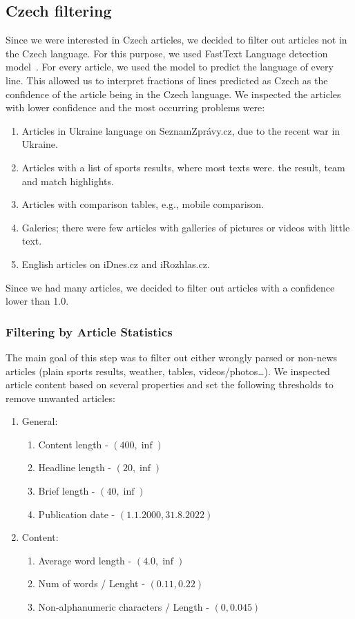 \subsection{Czech filtering}
Since we were interested in Czech articles, we decided to filter out articles
not in the Czech language. For this purpose,
we used FastText Language detection model~\parencites{joulinFastTextZipCompressing2016}{joulinBagTricksEfficient2016}.
For every article, we used the model to predict the language of every line.
This allowed us to interpret fractions of lines predicted as Czech as the confidence of the article being in the Czech language.
We inspected the articles with lower confidence and the most occurring problems were:
\begin{enumerate}
    \item Articles in Ukraine language on SeznamZprávy.cz, due to the recent war in Ukraine.
    \item Articles with a list of sports results, where most texts were.
          the result, team and match highlights.
    \item Articles with comparison tables, e.g., mobile comparison.
    \item Galeries; there were few articles with galleries of pictures or videos with little text.
    \item English articles on iDnes.cz and iRozhlas.cz.
\end{enumerate}
Since we had many articles, we decided to filter out articles with a confidence lower than 1.0.

\subsubsection{Filtering by Article Statistics}
\label{sec:filtering-by-article-statistics}
The main goal of this step was to filter out either wrongly parsed
or non-news articles (plain sports results, weather, tables, videos/photos\dots).
We inspected article content based on several properties
and set the following thresholds to remove unwanted articles:
\begin{enumerate}
    \item General:
          \begin{enumerate}
              \item Content length - $(400, \inf)$
              \item Headline length - $(20, \inf)$
              \item Brief length - $(40, \inf)$
              \item Publication date - $(1.1.2000, 31.8.2022)$
          \end{enumerate}
    \item Content:
          \begin{enumerate}
              \item Average word length - $(4.0, \inf)$
              \item Num of words / Lenght - $(0.11, 0.22)$
              \item Non-alphanumeric characters / Length - $(0, 0.045)$
          \end{enumerate}
\end{enumerate}

